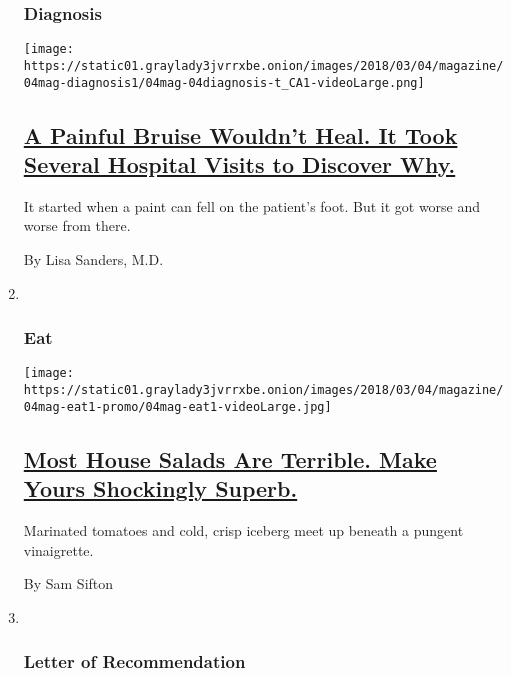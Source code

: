 \begin{enumerate}
{  \subsubsection{Diagnosis}\label{diagnosis}}

  \texttt{[image: https://static01.graylady3jvrrxbe.onion/images/2018/03/04/magazine/04mag-diagnosis1/04mag-04diagnosis-t\_CA1-videoLarge.png]}

  \hypertarget{a-painful-bruise-wouldnt-heal-it-took-several-hospital-visits-to-discover-why}{%
  \subsection{\texorpdfstring{\href{/2018/02/28/magazine/a-painful-bruise-wouldnt-heal-it-took-several-hospital-visits-to-discover-why.html}{A
  Painful Bruise Wouldn't Heal. It Took Several Hospital Visits to
  Discover
  Why.}}{A Painful Bruise Wouldn't Heal. It Took Several Hospital Visits to Discover Why.}}\label{a-painful-bruise-wouldnt-heal-it-took-several-hospital-visits-to-discover-why}}

  It started when a paint can fell on the patient's foot. But it got
  worse and worse from there.

  By Lisa Sanders, M.D.
\item ~
  \hypertarget{eat}{%
  \subsubsection{Eat}\label{eat}}

  \texttt{[image: https://static01.graylady3jvrrxbe.onion/images/2018/03/04/magazine/04mag-eat1-promo/04mag-eat1-videoLarge.jpg]}

  \hypertarget{most-house-salads-are-terrible-make-yours-shockingly-superb}{%
  \subsection{\texorpdfstring{\href{/2018/03/01/magazine/house-salad-lucali-pizza.html}{Most
  House Salads Are Terrible. Make Yours Shockingly
  Superb.}}{Most House Salads Are Terrible. Make Yours Shockingly Superb.}}\label{most-house-salads-are-terrible-make-yours-shockingly-superb}}

  Marinated tomatoes and cold, crisp iceberg meet up beneath a pungent
  vinaigrette.

  By Sam Sifton
\item ~
  \hypertarget{letter-of-recommendation}{%
  \subsubsection{Letter of
  Recommendation}\label{letter-of-recommendation}}


\end{enumerate}
